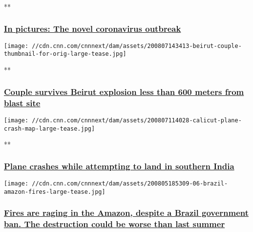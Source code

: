 **

\hypertarget{in-pictures-the-novel-coronavirus-outbreak}{%
\subsubsection{\texorpdfstring{\href{/2020/03/19/world/gallery/novel-coronavirus-outbreak/index.html}{In
pictures: The novel coronavirus
outbreak}}{In pictures: The novel coronavirus outbreak}}\label{in-pictures-the-novel-coronavirus-outbreak}}

\href{/videos/world/2020/08/07/beirut-explosion-survivors-lon-orig-bks.cnn}{}

\texttt{[image: //cdn.cnn.com/cnnnext/dam/assets/200807143413-beirut-couple-thumbnail-for-orig-large-tease.jpg]}

**

\hypertarget{couple-survives-beirut-explosion-less-than-600-meters-from-blast-site}{%
\subsubsection{\texorpdfstring{\href{/videos/world/2020/08/07/beirut-explosion-survivors-lon-orig-bks.cnn}{Couple
survives Beirut explosion less than 600 meters from blast
site}}{Couple survives Beirut explosion less than 600 meters from blast site}}\label{couple-survives-beirut-explosion-less-than-600-meters-from-blast-site}}

\href{/videos/world/2020/08/07/india-plane-crash-intl-ldn-vpx.cnn}{}

\texttt{[image: //cdn.cnn.com/cnnnext/dam/assets/200807114028-calicut-plane-crash-map-large-tease.jpg]}

**

\hypertarget{plane-crashes-while-attempting-to-land-in-southern-india}{%
\subsubsection{\texorpdfstring{\href{/videos/world/2020/08/07/india-plane-crash-intl-ldn-vpx.cnn}{Plane
crashes while attempting to land in southern
India}}{Plane crashes while attempting to land in southern India}}\label{plane-crashes-while-attempting-to-land-in-southern-india}}

\href{/2020/08/07/americas/brazil-bolsonaro-amazon-fires-intl/index.html}{}

\texttt{[image: //cdn.cnn.com/cnnnext/dam/assets/200805185309-06-brazil-amazon-fires-large-tease.jpg]}

\hypertarget{fires-are-raging-in-the-amazon-despite-a-brazil-government-ban-the-destruction-could-be-worse-than-last-summer-1}{%
\subsubsection{\texorpdfstring{\href{/2020/08/07/americas/brazil-bolsonaro-amazon-fires-intl/index.html}{Fires
are raging in the Amazon, despite a Brazil government ban. The
destruction could be worse than last
summer}}{Fires are raging in the Amazon, despite a Brazil government ban. The destruction could be worse than last summer}}\label{fires-are-raging-in-the-amazon-despite-a-brazil-government-ban-the-destruction-could-be-worse-than-last-summer-1}}

